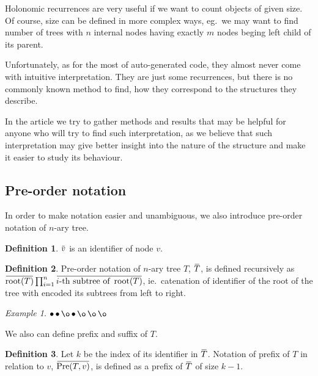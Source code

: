 \documentclass[final]{article}
\theoremstyle{definition}
\newtheorem{definition}{Definition}[subsection]
\theoremstyle{remark}
\newtheorem{example}{Example}[subsection]
\newcommand{\ols}[1]{\mskip.5\thinmuskip\overline{\mskip-.5\thinmuskip {#1} \mskip-.5\thinmuskip}\mskip.5\thinmuskip} %
\newcommand{\enc}[1]{\ensuremath{\ols{#1}}}
\DeclareMathOperator{\troot}{\text{root}}
\DeclareMathOperator{\tPre}{\text{Pre}}
\DeclareMathOperator{\n}{\bullet}
\DeclareMathOperator{\no}{\o}
\begin{document}
Holonomic recurrences are very useful if we want to count objects of given size. Of course, size can be defined in more complex ways, eg.\ we may want to find number of trees with \(n\) internal nodes having exactly \(m\) nodes beging left child of its parent.

Unfortunately, as for the most of auto-generated code, they almost never come with intuitive interpretation. They are just some recurrences, but there is no commonly known method to find, how they correspond to the structures they describe.

In the article we try to gather methods and results that may be helpful for anyone who will try to find such interpretation, as we believe that such interpretation may give better insight into the nature of the structure and make it easier to study its behaviour.

\subsection{Pre-order notation}%
\label{sub:pre_order_notation}



In order to make notation easier and unambiguous, we also introduce pre-order notation of \(n\)-ary tree.

\begin{definition}
    \(\enc{v}\) is an identifier of node \(v\). 
\end{definition}

\begin{definition}
    Pre-order notation of \(n\)-ary tree \(T\), \(\enc{T}\), is defined recursively as \(\enc{\troot(T)} \prod_{i=1}^{n} \enc{i\text{-th subtree of } \troot(T)}\), ie.\ catenation of identifier of the root of the tree with encoded its subtrees from left to right.
\end{definition}

\begin{example}
    \(\n \n \no \n \no \no \no\)
\end{example}

We also can define prefix and suffix of \(T\).

\begin{definition}
    Let \(k\) be the index of its identifier in \enc{T}. Notation of prefix of \(T\) in relation to \(v\), \(\enc{\tPre(T, v)}\), is defined as a prefix of \enc{T} of size \(k - 1\).
\end{definition}
\end{document}
